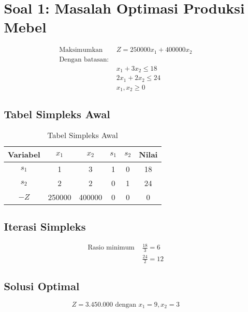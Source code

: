 \documentclass{article}
\begin{document}
\section*{Soal 1: Masalah Optimasi Produksi Mebel}

\begin{align*}
\text{Maksimumkan } & Z = 250000x_1 + 400000x_2 \\
\text{Dengan batasan: } & \\
& x_1 + 3x_2 \leq 18 \\
& 2x_1 + 2x_2 \leq 24 \\
& x_1, x_2 \geq 0
\end{align*}

\subsection*{Tabel Simpleks Awal}
\begin{table}[ht]
  \centering
  \caption{Tabel Simpleks Awal}
  \begin{tabular}{cccccc}
    \toprule
    Variabel & $x_1$ & $x_2$ & $s_1$ & $s_2$ & Nilai \\
    \midrule
    $s_1$    & 1     & 3     & 1     & 0     & 18    \\
    $s_2$    & 2     & 2     & 0     & 1     & 24    \\
    \midrule
    $-Z$     & 250000 & 400000 & 0 & 0 & 0 \\
    \bottomrule
  \end{tabular}
\end{table}

\subsection*{Iterasi Simpleks}
\begin{align*}
\text{Rasio minimum } & \frac{18}{3} = 6 \\
& \frac{24}{2} = 12
\end{align*}

\subsection*{Solusi Optimal}
\begin{equation*}
Z = 3.450.000 \text{ dengan } x_1 = 9, x_2 = 3
\end{equation*}
\end{document}
